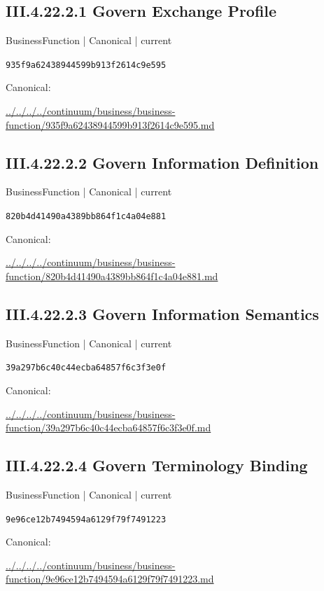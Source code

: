 \documentclass[10pt,a4paper]{article}
\begin{document}
\subsection*{III.4.22.2.1 Govern Exchange Profile}
{\small BusinessFunction | Canonical | current}\par
\texttt{935f9a62438944599b913f2614c9e595}\par
Canonical: \par
{\footnotesize\url{../../../../continuum/business/business-function/935f9a62438944599b913f2614c9e595.md}}\par
\subsection*{III.4.22.2.2 Govern Information Definition}
{\small BusinessFunction | Canonical | current}\par
\texttt{820b4d41490a4389bb864f1c4a04e881}\par
Canonical: \par
{\footnotesize\url{../../../../continuum/business/business-function/820b4d41490a4389bb864f1c4a04e881.md}}\par
\subsection*{III.4.22.2.3 Govern Information Semantics}
{\small BusinessFunction | Canonical | current}\par
\texttt{39a297b6c40c44ecba64857f6c3f3e0f}\par
Canonical: \par
{\footnotesize\url{../../../../continuum/business/business-function/39a297b6c40c44ecba64857f6c3f3e0f.md}}\par
\subsection*{III.4.22.2.4 Govern Terminology Binding}
{\small BusinessFunction | Canonical | current}\par
\texttt{9e96ce12b7494594a6129f79f7491223}\par
Canonical: \par
{\footnotesize\url{../../../../continuum/business/business-function/9e96ce12b7494594a6129f79f7491223.md}}\par
\end{document}
